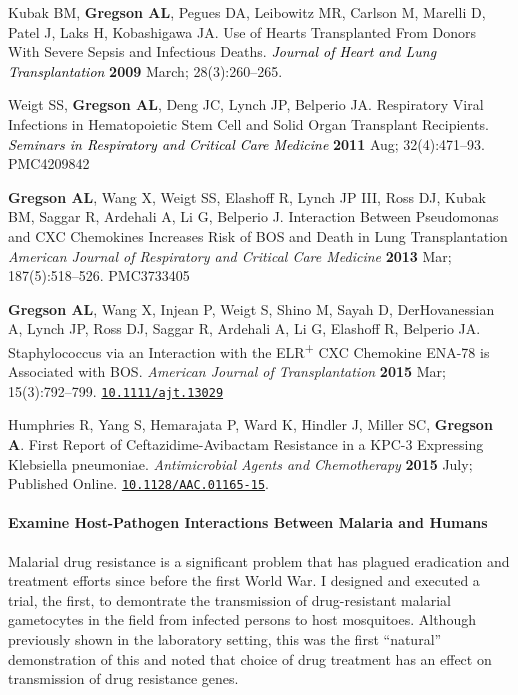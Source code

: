 \documentclass[11pt]{nih-blank}%
\newcommand{\txsp}[1]{\textsuperscript{#1}}
\numberwithin{equation}{subsection}
\numberwithin{figure}{subsection}
\numberwithin{table}{subsection}
\begin{document}
\begin{thebibliography}{2}

 \bibitem[1]{} Kubak BM, \textbf{Gregson AL}, Pegues DA, Leibowitz MR, Carlson M, Marelli D, Patel J, Laks H, Kobashigawa JA. Use of Hearts Transplanted From Donors With Severe Sepsis and Infectious Deaths. \textcolor{Black}{\textit{Journal of Heart and Lung Transplantation}} \textbf{2009} March; 28(3):260--265. 

  \bibitem[2]{} Weigt SS, \textbf{Gregson AL}, Deng JC, Lynch JP, Belperio JA. Respiratory Viral Infections in Hematopoietic Stem Cell and Solid Organ Transplant Recipients. \textcolor{Black}{\textit{Seminars in Respiratory and Critical Care Medicine}} \textbf{2011} Aug; 32(4):471--93. PMC4209842

  \bibitem[3]{} \textbf{Gregson AL}, Wang X, Weigt SS, Elashoff R, Lynch JP III, Ross DJ, Kubak BM, Saggar R, Ardehali A, Li G, Belperio J. Interaction Between Pseudomonas and CXC Chemokines Increases Risk of {\smaller BOS} and Death in Lung Transplantation {\color{Black}\textit{American Journal of Respiratory and Critical Care Medicine}} \textbf{2013} Mar; 187(5):518--526. PMC3733405

\bibitem[4]{} \textbf{Gregson AL}, Wang X, Injean P, Weigt S, Shino M, Sayah D, DerHovanessian A, Lynch JP, Ross DJ, Saggar R, Ardehali A, Li G, Elashoff R, Belperio JA. Staphylococcus via an Interaction with the {\smaller ELR}\txsp{+} {\smaller CXC} Chemokine {\smaller ENA}-78 is Associated with {\smaller BOS}. \textit{American Journal of Transplantation} \textbf{2015} Mar; 15(3):792--799. \href{http://onlinelibrary.wiley.com/doi/10.1111/ajt.13029/abstract}{\nolinkurl{10.1111/ajt.13029}}

\bibitem[5]{} Humphries R, Yang S, Hemarajata P, Ward K, Hindler J, Miller SC, \textbf{Gregson A}. First Report of Ceftazidime-Avibactam Resistance in a KPC-3 Expressing Klebsiella pneumoniae. \textit{Antimicrobial Agents and Chemotherapy} \textbf{2015} July; Published Online. \href{http://aac.asm.org/content/early/2015/07/14/AAC.01165-15.long}{\nolinkurl{10.1128/AAC.01165-15}}.

\end{thebibliography}


\paragraph{Examine Host-Pathogen Interactions Between Malaria and Humans}
Malarial drug resistance is a significant problem that has plagued eradication and treatment efforts since before the first World War. 
I designed and executed a trial, the first, to demontrate the transmission of drug-resistant malarial gametocytes in the field from infected persons to host mosquitoes. 
Although previously shown in the laboratory setting, this was the first ``natural'' demonstration of this and noted that choice of drug treatment has an effect on transmission of drug resistance genes. 
\end{document}
